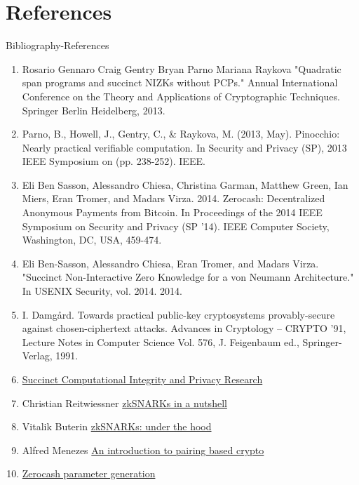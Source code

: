 \documentclass[handouts]{beamer}
\begin{document}
\section{References}
\begin{frame}{Bibliography-References}
\begin{tiny}
\begin{enumerate}
\item Rosario Gennaro Craig Gentry Bryan Parno Mariana Raykova "Quadratic span programs and succinct NIZKs without PCPs." Annual International Conference on the Theory and Applications of Cryptographic Techniques. Springer Berlin Heidelberg, 2013.
\item Parno, B., Howell, J., Gentry, C., & Raykova, M. (2013, May). Pinocchio: Nearly practical verifiable computation. In Security and Privacy (SP), 2013 IEEE Symposium on (pp. 238-252). IEEE.
\item Eli Ben Sasson, Alessandro Chiesa, Christina Garman, Matthew Green, Ian Miers, Eran Tromer, and Madars Virza. 2014. Zerocash: Decentralized Anonymous Payments from Bitcoin. In Proceedings of the 2014 IEEE Symposium on Security and Privacy (SP '14). IEEE Computer Society, Washington, DC, USA, 459-474. 
\item Eli Ben-Sasson, Alessandro Chiesa, Eran Tromer, and Madars Virza. "Succinct Non-Interactive Zero Knowledge for a von Neumann Architecture." In USENIX Security, vol. 2014. 2014.
\item I. Damgård. Towards practical public-key cryptosystems provably-secure against chosen-ciphertext attacks. Advances in Cryptology – CRYPTO ’91, Lecture Notes
in Computer Science Vol. 576, J. Feigenbaum ed., Springer-Verlag, 1991.
\item \href{http://www.scipr-lab.org/}{Succinct Computational Integrity and Privacy Research}
\item Christian Reitwiessner \href{https://blog.ethereum.org/2016/12/05/zksnarks-in-a-nutshell/}{zkSNARKs in a nutshell}
\item Vitalik Buterin \href{https://medium.com/@VitalikButerin/zk-snarks-under-the-hood-b33151a013f6}{zkSNARKs: under the hood}
\item Alfred Menezes \href{https://www.math.uwaterloo.ca/~ajmeneze/publications/pairings.pdf}{An introduction to pairing based crypto}
\item \href{https://z.cash/technology/paramgen.html}{Zerocash parameter generation}
\end{enumerate}
\end{tiny}
\end{frame}
\end{document}
